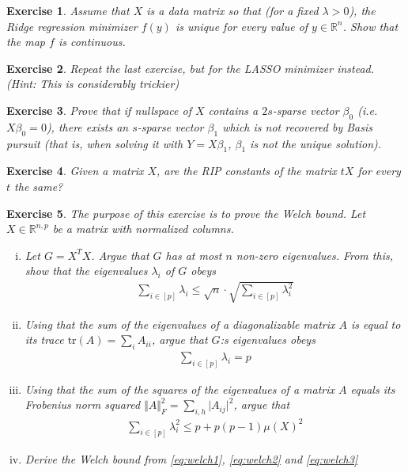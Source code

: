\documentclass{article}
\newcommand{\tr}{\mathrm{tr}}
\newcommand{\R}{\mathbb{R}}
\newtheorem{exercise}{Exercise}
\newcommand{\abs}[1]{\vert #1 \vert}
\newcommand{\norm}[1]{\Vert #1 \Vert}
\begin{document}
\begin{exercise}
    Assume that $X$ is a data matrix so that (for a fixed $\lambda>0$), the Ridge regression minimizer $f(y)$ is unique for every value of $y \in \R^n$. Show that the map $f$ is continuous. 
\end{exercise}

\begin{exercise}
    Repeat the last exercise, but for the LASSO minimizer instead. (\emph{Hint}: This is considerably trickier)
\end{exercise}

\begin{exercise}
    Prove that if nullspace of $X$ contains a $2s$-sparse vector $\beta_0$ (i.e. $X\beta_0=0$), there exists an $s$-sparse vector $\beta_1$ which is not recovered by Basis pursuit (that is, when solving it with $Y=X\beta_1$, $\beta_1$ is not the unique solution).
\end{exercise}

\begin{exercise}
    Given a matrix $X$, are the RIP constants of the matrix $tX$ for every $t$ the same? 
\end{exercise}



\begin{exercise}
    The purpose of this exercise is to prove the Welch bound. Let $X \in \R^{n,p}$ be a matrix with normalized columns.
    \begin{enumerate}[(i)]
        \item Let $G= X^TX$. Argue that $G$ has at most $n$ non-zero eigenvalues. From this, show that the eigenvalues $\lambda_i$ of $G$ obeys
        \begin{align}
            \sum_{i \in [p]} \lambda_i \leq \sqrt{n} \cdot \sqrt{\sum_{i \in [p]} \lambda_i^2} \label{eq:welch1}
        \end{align}
        \item Using that the sum of the eigenvalues of a diagonalizable matrix $A$ is equal to its trace $\tr(A) = \sum_i A_{ii}$, argue that $G$:s eigenvalues obeys
        \begin{align}
            \sum_{i \in [p]} \lambda_i = p \label{eq:welch2}
        \end{align}
        \item Using that the sum of the squares of the eigenvalues of a matrix $A$ equals its Frobenius norm squared $\norm{A}_F^2= \sum_{i,h} \abs{A_{ij}}^2$, argue that
        \begin{align}
            \sum_{i \in [p]} \lambda_i^2 \leq p + p(p-1)\mu(X)^2 \label{eq:welch3}
        \end{align}
        \item Derive the Welch bound from \eqref{eq:welch1}, \eqref{eq:welch2} and \eqref{eq:welch3}
    \end{enumerate}
\end{exercise}
\end{document}
